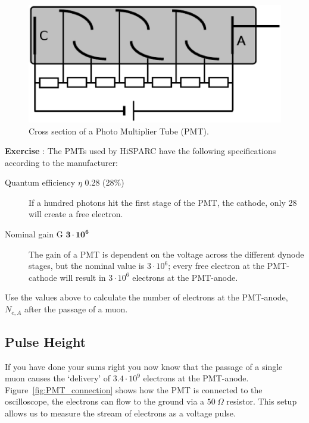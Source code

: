\documentclass[12pt,a4paper]{article}
\numberwithin{equation}{section}
\numberwithin{figure}{section}
\newcounter{Exercise}
\numberwithin{table}{section}
\begin{document}
\begin{figure}\begin{center}
\includegraphics[scale=0.38]{PMT_cross_section.eps}%
\caption{Cross section of a Photo Multiplier Tube (PMT).}\label{fig:PMT_cross_section}
\end{center}\end{figure}

\begin{shaded}
\textbf{Exercise \theExercise {}} : The PMTs used by HiSPARC have the following specifications according to the manufacturer:
\begin{description}
\item [Quantum efficiency $\eta$ 0.28 (28\%)] If a hundred photons hit the first stage of the PMT, the cathode, only 28 will create a free electron.
\item [Nominal gain G $ \mathbf{3 \cdot 10^6}$] The gain of a PMT is dependent on the voltage across the different dynode stages, but the nominal value is $3 \cdot 10^6$; every free electron at the PMT-cathode will result in $3 \cdot 10^6$ electrons at the PMT-anode.
\end{description}
Use the values above to calculate the number of electrons at the PMT-anode, $N_{e,A}$ after the passage of a muon.
\end{shaded}

\subsection{Pulse Height}
If you have done your sums right you now know that the passage of a single muon causes the `delivery' of $3.4 \cdot 10^9$ electrons at the PMT-anode. Figure~\ref{fig:PMT_connection} shows how the PMT is connected to the oscilloscope, the electrons can flow to the ground via a $50~\Omega$ resistor. This setup allows us to measure the stream of electrons as a voltage pulse.
\end{document}
